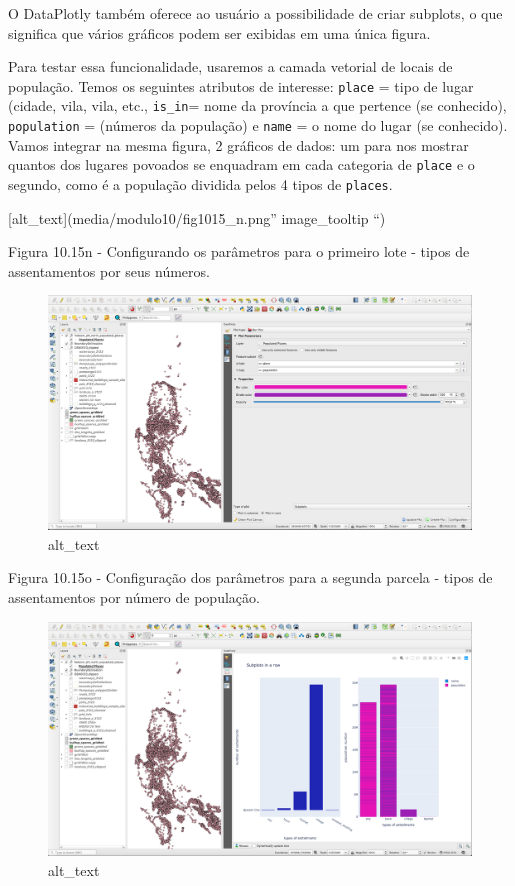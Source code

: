 \documentclass[
]{book}
\begin{document}
O DataPlotly também oferece ao usuário a possibilidade de criar subplots, o que significa que vários gráficos podem ser exibidas em uma única figura.

Para testar essa funcionalidade, usaremos a camada vetorial de locais de população. Temos os seguintes atributos de interesse: \texttt{place} = tipo de lugar (cidade, vila, vila, etc., \texttt{is\_in}= nome da província a que pertence (se conhecido), \texttt{population} = (números da população) e \texttt{name} = o nome do lugar (se conhecido). Vamos integrar na mesma figura, 2 gráficos de dados: um para nos mostrar quantos dos lugares povoados se enquadram em cada categoria de \texttt{place} e o segundo, como é a população dividida pelos 4 tipos de \texttt{places}.

{[}alt\_text{]}(media/modulo10/fig1015\_n.png'' image\_tooltip ``)

Figura 10.15n - Configurando os parâmetros para o primeiro lote - tipos de assentamentos por seus números.

\begin{figure}
\centering
\includegraphics{media/modulo10/fig1015_o.png}
\caption{alt\_text}
\end{figure}

Figura 10.15o - Configuração dos parâmetros para a segunda parcela - tipos de assentamentos por número de população.

\begin{figure}
\centering
\includegraphics{media/modulo10/fig1015_p.png}
\caption{alt\_text}
\end{figure}
\end{document}
